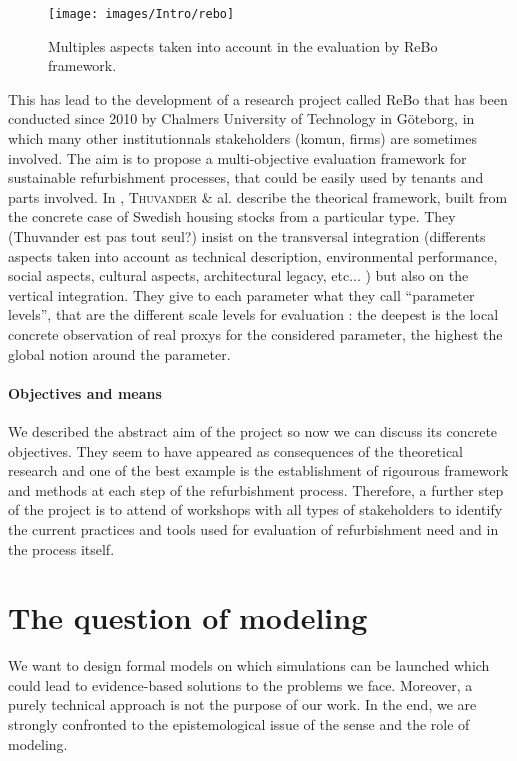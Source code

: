 \documentclass[english]{article}
\newcommand{\noun}[1]{\textsc{#1}}
\begin{document}
\begin{figure}
\texttt{[image: images/Intro/rebo]}\caption{Multiples aspects taken into account in the evaluation by ReBo framework.}


\end{figure}


\bigskip{}


This has lead to the development of a research project called ReBo that has been
conducted since 2010 by Chalmers University of Technology in Göteborg,
in which many other institutionnals stakeholders (komun, firms) are
sometimes involved. The aim is to propose a multi-objective evaluation
framework for sustainable refurbishment processes, that could be easily
used by tenants and parts involved. In \cite{thuvander2011strategies},
\noun{Thuvander} \& al. describe the theorical framework, built from
the concrete case of Swedish housing stocks from a particular type.
They (Thuvander est pas tout seul?) insist on the transversal integration (differents aspects taken
into account as technical description, environmental performance,
social aspects, cultural aspects, architectural legacy, etc... ) but
also on the vertical integration. They give to each parameter what
they call ``parameter levels'', that are the different scale levels
for evaluation : the deepest is the local concrete observation of
real proxys for the considered parameter, the highest the global notion
around the parameter.


\paragraph{Objectives and means}

We described the abstract aim of the project so now we can discuss its concrete
objectives. They seem to have appeared as consequences of the theoretical
research and one of the best example is the establishment
of rigourous framework and methods at each step of the refurbishment
process. Therefore, a further step of the project is to attend
of workshops with all types of stakeholders to identify the current
practices and tools used for evaluation of refurbishment need and
in the process itself.


\section{The question of modeling}

We want to design formal models on which simulations can be
launched which could lead to evidence-based solutions to the problems
we face. Moreover, a purely technical approach is not the purpose
of our work. In the end, we are strongly confronted to the epistemological issue
of the sense and the role of modeling.
\end{document}
